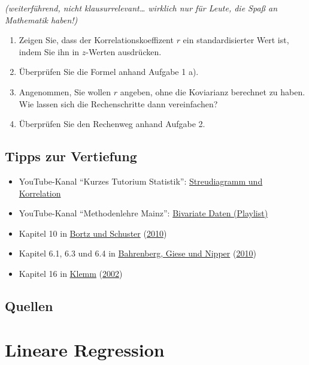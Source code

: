 \documentclass[
  ngerman,
]{article}
\providecommand{\tightlist}{%
  \setlength{\itemsep}{0pt}\setlength{\parskip}{0pt}}
\begin{document}
\emph{(weiterführend, nicht klausurrelevant\ldots{} wirklich nur für Leute, die Spaß an Mathematik haben!)}

\begin{enumerate}
\def\labelenumi{\alph{enumi})}
\tightlist
\item
  Zeigen Sie, dass der Korrelationskoeffizent \(r\) ein standardisierter Wert ist, indem Sie ihn in \(z\)-Werten ausdrücken.
\item
  Überprüfen Sie die Formel anhand Aufgabe 1 a).
\item
  Angenommen, Sie wollen \(r\) angeben, ohne die Koviarianz berechnet zu haben. Wie lassen sich die Rechenschritte dann vereinfachen?
\item
  Überprüfen Sie den Rechenweg anhand Aufgabe 2.
\end{enumerate}

\hypertarget{tipps-zur-vertiefung-6}{%
\subsection{Tipps zur Vertiefung}\label{tipps-zur-vertiefung-6}}

\begin{itemize}
\tightlist
\item
  YouTube-Kanal ``Kurzes Tutorium Statistik'': \href{https://www.youtube.com/watch?v=IwJ7RPIAxUo}{Streudiagramm und Korrelation}
\item
  YouTube-Kanal ``Methodenlehre Mainz'': \href{https://www.youtube.com/playlist?list=PLJ-Cm_fyeZdwUkkeXkl2D1Czukhhl-9B2}{Bivariate Daten (Playlist)}
\item
  Kapitel 10 in \protect\hyperlink{ref-bortz}{Bortz und Schuster} (\protect\hyperlink{ref-bortz}{2010})
\item
  Kapitel 6.1, 6.3 und 6.4 in \protect\hyperlink{ref-bahrenberg}{Bahrenberg, Giese und Nipper} (\protect\hyperlink{ref-bahrenberg}{2010})
\item
  Kapitel 16 in \protect\hyperlink{ref-klemm}{Klemm} (\protect\hyperlink{ref-klemm}{2002})
\end{itemize}

\hypertarget{quellen-6}{%
\subsection{Quellen}\label{quellen-6}}

\hypertarget{lineare-regression}{%
\section{Lineare Regression}\label{lineare-regression}}
\end{document}
